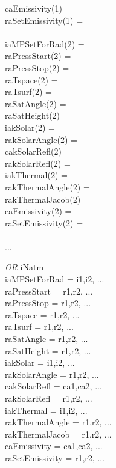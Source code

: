 \documentclass[12pt]{article}
\newcommand{\ttab}{\indent\indent}
\begin{document}
{{\ttab caEmissivity(1)    = \\
\ttab raSetEmissivity(1) = \\
\ttab \\
\ttab iaMPSetForRad(2)   = \\
\ttab raPressStart(2)    = \\
\ttab raPressStop(2)     = \\
\ttab raTspace(2)        = \\
\ttab raTsurf(2)         = \\
\ttab raSatAngle(2)      = \\
\ttab raSatHeight(2)     = \\
\ttab iakSolar(2)        = \\
\ttab rakSolarAngle(2)   = \\
\ttab cakSolarRefl(2)    = \\
\ttab rakSolarRefl(2)    = \\
\ttab iakThermal(2)      = \\
\ttab rakThermalAngle(2) = \\
\ttab rakThermalJacob(2) = \\
\ttab caEmissivity(2)    = \\
\ttab raSetEmissivity(2) = \\
\ttab \\
\ttab ...\\
}

{\em OR}
\ttab iNatm\\
\ttab iaMPSetForRad   = i1,i2, ...\\
\ttab raPressStart    = r1,r2, ...\\
\ttab raPressStop     = r1,r2, ...\\
\ttab raTspace        = r1,r2, ...\\
\ttab raTsurf         = r1,r2, ...\\
\ttab raSatAngle      = r1,r2, ...\\
\ttab raSatHeight     = r1,r2, ...\\
\ttab iakSolar        = i1,i2, ... \\
\ttab rakSolarAngle   = r1,r2, ...\\
\ttab cakSolarRefl    = ca1,ca2, ...\\
\ttab rakSolarRefl    = r1,r2, ...\\
\ttab iakThermal      = i1,i2, ...\\
\ttab rakThermalAngle = r1,r2, ...\\
\ttab rakThermalJacob = r1,r2, ...\\
\ttab caEmissivity    = ca1,ca2, ...\\
\ttab raSetEmissivity = r1,r2, ...\\

}
\end{document}
